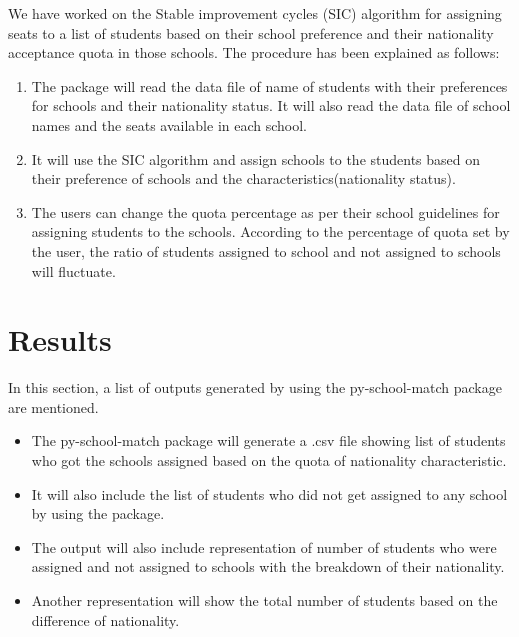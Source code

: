 \documentclass[twocolumn]{article}
\begin{document}
We have worked on the Stable improvement cycles (SIC) algorithm for assigning seats to a list of students based on their school preference and their nationality acceptance quota in those schools. The procedure has been explained as follows:\\
\begin{enumerate}
    \vspace{-0.4cm}\item The package will read the data file of name of students with their preferences for schools and their nationality status. It will also read the data file of school names and the seats available in each school.\\
    \vspace{-0.4cm}\item It will use the SIC algorithm and assign schools to the students based on their preference of schools and the characteristics(nationality status).\\
    \vspace{-0.4cm}\item The users can change the quota percentage as per their school guidelines for assigning students to the schools. According to the percentage of quota set by the user, the ratio of students assigned to school and not assigned to schools will fluctuate.\\
\end{enumerate}

\section{Results}

In this section, a list of outputs generated by using the py-school-match package are mentioned.\\

\begin{itemize}
    \vspace{-0.4cm}\item The py-school-match package will generate a .csv file showing list of students who got the schools assigned based on the quota of nationality characteristic.\\
    \vspace{-0.4cm}\item It will also include the list of students who did not get assigned to any school by using the package.\\
    \vspace{-0.4cm}\item The output will also include representation of number of students who were assigned and not assigned to schools with the breakdown of their nationality.\\
    \vspace{-0.4cm}\item Another representation will show the total number of students based on the difference of nationality.\\
\end{itemize}
\end{document}
